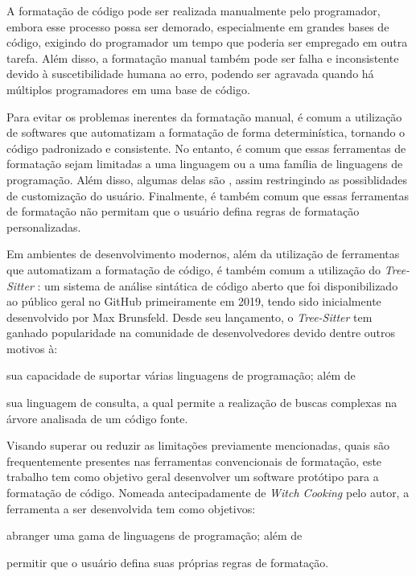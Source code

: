 \documentclass
  [11pt, a4paper, english, openright, sumario = tradicional, twoside, brazil]
  {abntex2}
\begin{document}
  A formatação de código pode ser realizada manualmente pelo programador,
  embora esse processo possa ser demorado, especialmente em grandes bases de
  código, exigindo do programador um tempo que poderia ser empregado em outra
  tarefa. Além disso, a formatação manual também pode ser falha e inconsistente
  devido à suscetibilidade humana ao erro, podendo ser agravada quando há
  múltiplos programadores em uma base de código.

  Para evitar os problemas inerentes da formatação manual, é comum a utilização
  de softwares que automatizam a formatação de forma determinística, tornando o
  código padronizado e consistente. No entanto, é comum que essas ferramentas
  de formatação sejam limitadas a uma linguagem ou a uma família de linguagens
  de programação. Além disso, algumas delas são \textit{},
  assim restringindo as possiblidades de customização do usuário. Finalmente, é
  também comum que essas ferramentas de formatação não permitam que o usuário
  defina regras de formatação personalizadas.

  Em ambientes de desenvolvimento modernos, além da utilização de ferramentas
  que automatizam a formatação de código, é também comum a utilização do
  \textit{Tree-Sitter} \cite{tree-sitter-2018-tree}: um sistema de análise
  sintática de código aberto que foi disponibilizado ao público geral no GitHub
  primeiramente em 2019, tendo sido inicialmente desenvolvido por Max
  Brunsfeld. Desde seu lançamento, o \textit{Tree-Sitter} tem ganhado
  popularidade na comunidade de desenvolvedores devido dentre outros motivos à:
  \begin{inparaenum}
    \item sua capacidade de suportar várias linguagens de programação; além de
    \item sua linguagem de consulta, a qual permite a realização de buscas
          complexas na árvore analisada de um código fonte.
  \end{inparaenum}

  Visando superar ou reduzir as limitações previamente mencionadas, quais são
  frequentemente presentes nas ferramentas convencionais de formatação, este
  trabalho tem como objetivo geral desenvolver um software protótipo para a
  formatação de código. Nomeada antecipadamente de \textit{Witch Cooking}
  \cite{silva-2023-witch} pelo autor, a ferramenta a ser desenvolvida tem como
  objetivos:
  \begin{inparaenum}
    \item abranger uma gama de linguagens de programação; além de
    \item permitir que o usuário defina suas próprias regras de formatação.
  \end{inparaenum}
\end{document}

